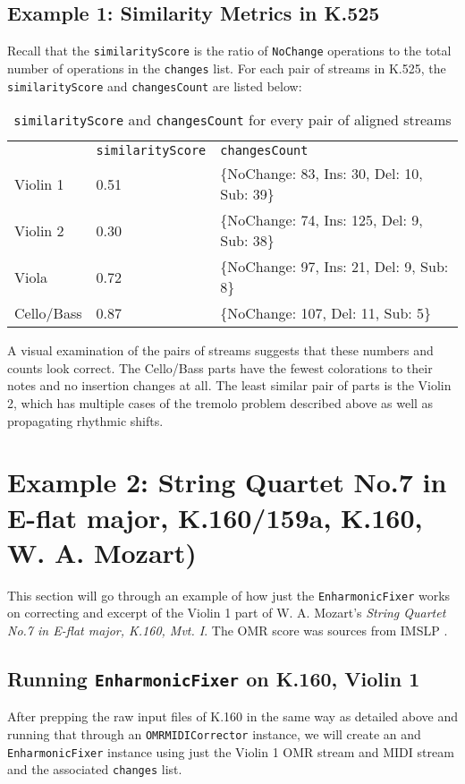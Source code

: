 \subsection{Example 1: Similarity Metrics in K.525}
Recall that the \texttt{similarityScore} is the ratio of \texttt{NoChange} operations to the total number of operations in the \texttt{changes} list. For each pair of streams in K.525, the \texttt{similarityScore} and \texttt{changesCount} are listed below:
\begin{table}[H]
\centering
\begin{tabular}{lll}
           & \texttt{similarityScore} & \texttt{changesCount}                                                  \\
Violin 1   & 0.51                       & \{NoChange: 83, Ins: 30, Del: 10, Sub: 39\} \\
Violin 2   & 0.30                       & \{NoChange: 74, Ins: 125, Del: 9, Sub: 38\} \\
Viola      & 0.72                       & \{NoChange: 97, Ins: 21, Del: 9, Sub: 8\}   \\
Cello/Bass & 0.87                       & \{NoChange: 107, Del: 11, Sub: 5\}               
\end{tabular}
\caption{\texttt{similarityScore} and \texttt{changesCount} for every pair of aligned streams}
\end{table}

A visual examination of the pairs of streams suggests that these numbers and counts look correct. The Cello/Bass parts have the fewest colorations to their notes and no insertion changes at all. The least similar pair of parts is the Violin 2, which has multiple cases of the tremolo problem described above as well as propagating rhythmic shifts.

\section{Example 2: String Quartet No.7 in E-flat major, K.160/159a, K.160, W. A. Mozart)}
This section will go through an example of how just the \texttt{EnharmonicFixer} works on correcting and excerpt of the Violin 1 part of W. A. Mozart's \textit{String Quartet No.7 in E-flat major, K.160, Mvt. I}. The OMR score was sources from IMSLP \cite{k160}.

\subsection{Running \texttt{EnharmonicFixer} on K.160, Violin 1}
After prepping the raw input files of K.160 in the same way as detailed above and running that through an \texttt{OMRMIDICorrector} instance, we will create an and \texttt{EnharmonicFixer} instance using just the Violin 1 OMR stream and MIDI stream and the associated \texttt{changes} list.

